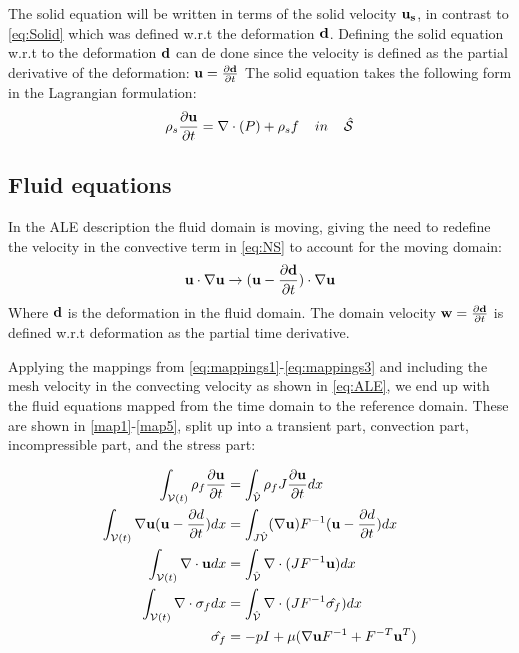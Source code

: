 The solid equation will be written in terms of the solid velocity $\bold{u_s}$, in contrast to \ref{eq:Solid} which was defined w.r.t the deformation $\bold{d}$. Defining the solid equation w.r.t to the deformation $\bold{d}$ can de done since the velocity is defined as the partial derivative of the deformation: $\bold{u} = \frac{\partial \bold{d}}{\partial t}$
The solid equation takes the following form in the Lagrangian formulation:
\begin{equation} \label{eq:solid}
\rho_s \frac{\partial \bold{u}}{\partial t} = \nabla \cdot (P) + \rho_s f \hspace{4mm}in\hspace{4mm} \hat{\mathcal{S}} 
\end{equation}
\subsection{Fluid equations}
In the ALE description the fluid domain is moving, giving the need to redefine the velocity in the convective term in \eqref{eq:NS} to account for the moving domain: 
\begin{equation}
\bold{u} \cdot \nabla \bold{u} \rightarrow (\bold{u}-\frac{\partial \bold{d}}{\partial t}) \cdot \nabla \bold{u}  
\end{equation}
Where $\bold{d}$ is the deformation in the fluid domain. The domain velocity $\bold{w} = \frac{\partial \bold{d}}{\partial t}$ is defined w.r.t deformation as the partial time derivative.

Applying the mappings from \eqref{eq:mappings1}-\eqref{eq:mappings3} and including the mesh velocity in the convecting velocity as shown in \eqref{eq:ALE}, we end up with the fluid equations mapped from the time domain to the reference domain. These are shown in \ref{map1}-\ref{map5}, split up into a transient part, convection part, incompressible part, and the stress part:

\begin{align}
\int_{\mathcal{V}(t)} \rho_f \frac{\partial \bold{u}}{\partial t}  & = \int_{\hat{\mathcal{V}}}  \rho_f J \frac{\partial \bold{u}}{\partial t} dx \label{map1} \\
\int_{\mathcal{V}(t)} \nabla \bold{u} (\bold{u}-\frac{\partial d}{\partial t}) dx  &= \int_{J \hat{\mathcal{V}}} (\nabla \bold{u})F^{-1}(\bold{u}-\frac{\partial d}{\partial t}) dx  \label{map2}\\
\int_{\mathcal{V}(t)} \nabla \cdot \bold{u} dx  &=\int_{\hat{\mathcal{V}}}  \nabla \cdot (J F^{-1} \bold{u}  ) dx \label{map3} \\
\int_{\mathcal{V}(t)} \nabla \cdot \sigma_f dx &= \int_{\hat{\mathcal{V}}} \nabla \cdot( J F^{-1} \hat{\sigma_f} )     dx \label{map4} \\
\hat{\sigma_f} &= -pI + \mu ( \nabla \bold{u} F^{-1} + F^{-T} \bold{u}^{T}  ) \label{map5}
\end{align}

